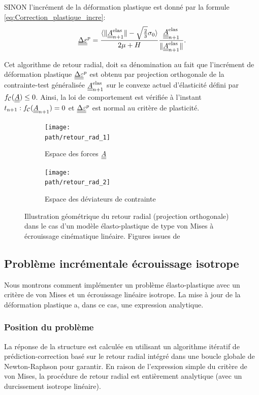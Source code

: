 \documentclass[10pt]{book}
\def\path{./fig}
\newcommand{\FthEpsp}{\ten{A}}
\begin{document}
\begin{appendices}
\begin{enumerate}
SINON l'incrément de la déformation plastique est donné par la formule \eqref{eq:Correction_plastique_incre}:
$$\DeltaEpsP=\frac{\langle\Vert\FthEpsp_{n+1}^{\text{elas}}\Vert-\sqrt{\frac{2}{3}}\sigma_{0}\rangle}{2\mu+H}\frac{\vec{\FthEpsp}_{n+1}^{\text{elas}}}{\Vert \FthEpsp_{n+1}^{\text{elas}}\Vert}.$$
\end{enumerate}
Cet algorithme de retour radial, doit sa dénomination au fait que l'incrément de déformation plastique $\underline{\underline{\Delta}}\underline{\underline{\varepsilon}}^{p}$ est obtenu par projection orthogonale de la contrainte-test généralisée $\FthEpsp_{n+1}^{\text{elas}}$ sur le convexe actuel d'élasticité défini par $\FChargeConvexe(\FthEpsp) \leq 0$. Ainsi, la loi de comportement est vérifiée à l'instant $t_{\mathrm{n}+1}:\FChargeConvexe(\FthEpsp_{n+1})=0$ et $\underline{\underline{\Delta}}\underline{\underline{\varepsilon}}^{p}$ est normal au critère de plasticité.
\begin{figure}[!h]
\begin{subfigure}[b]{0.49\textwidth}
\centering \texttt{[image: \\path/retour\_rad\_1]}
\caption{Espace des forces $\FthEpsp$}
\end{subfigure}
\begin{subfigure}[b]{0.49\textwidth}
\centering \texttt{[image: \\path/retour\_rad\_2]}
\caption{Espace des déviateurs de contrainte}
\end{subfigure}
\caption{Illustration géométrique du \og retour radial \fg{} (projection orthogonale) dans le cas d'un modèle élasto-plastique de type von Mises à écrouissage cinématique linéaire. Figures issues de \cite{maitournam2017materiaux}}
\end{figure}
\subsection{Problème incrémentale écrouissage isotrope}
Nous montrons comment implémenter un problème élasto-plastique avec un critère de von Mises et un écrouissage linéaire isotrope. La mise à jour de la déformation plastique a, dans ce cas, une expression analytique. 
\subsubsection{Position du problème}
La réponse de la structure est calculée en utilisant un algorithme itératif de prédiction-correction basé sur le retour radial intégré dans une boucle globale de Newton-Raphson pour garantir. En raison de l'expression simple du critère de von Mises, la procédure de retour radial est entièrement analytique (avec un durcissement isotrope linéaire).

\end{appendices}
\end{document}

